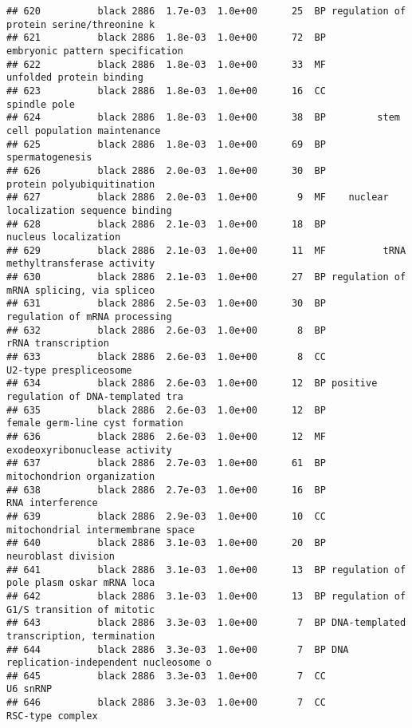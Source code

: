 \documentclass[]{article}
\begin{document}
\begin{verbatim}
## 620          black 2886  1.7e-03  1.0e+00      25  BP regulation of protein serine/threonine k
## 621          black 2886  1.8e-03  1.0e+00      72  BP          embryonic pattern specification
## 622          black 2886  1.8e-03  1.0e+00      33  MF                 unfolded protein binding
## 623          black 2886  1.8e-03  1.0e+00      16  CC                             spindle pole
## 624          black 2886  1.8e-03  1.0e+00      38  BP         stem cell population maintenance
## 625          black 2886  1.8e-03  1.0e+00      69  BP                          spermatogenesis
## 626          black 2886  2.0e-03  1.0e+00      30  BP               protein polyubiquitination
## 627          black 2886  2.0e-03  1.0e+00       9  MF    nuclear localization sequence binding
## 628          black 2886  2.1e-03  1.0e+00      18  BP                     nucleus localization
## 629          black 2886  2.1e-03  1.0e+00      11  MF          tRNA methyltransferase activity
## 630          black 2886  2.1e-03  1.0e+00      27  BP regulation of mRNA splicing, via spliceo
## 631          black 2886  2.5e-03  1.0e+00      30  BP            regulation of mRNA processing
## 632          black 2886  2.6e-03  1.0e+00       8  BP                       rRNA transcription
## 633          black 2886  2.6e-03  1.0e+00       8  CC                   U2-type prespliceosome
## 634          black 2886  2.6e-03  1.0e+00      12  BP positive regulation of DNA-templated tra
## 635          black 2886  2.6e-03  1.0e+00      12  BP          female germ-line cyst formation
## 636          black 2886  2.6e-03  1.0e+00      12  MF            exodeoxyribonuclease activity
## 637          black 2886  2.7e-03  1.0e+00      61  BP               mitochondrion organization
## 638          black 2886  2.7e-03  1.0e+00      16  BP                         RNA interference
## 639          black 2886  2.9e-03  1.0e+00      10  CC        mitochondrial intermembrane space
## 640          black 2886  3.1e-03  1.0e+00      20  BP                      neuroblast division
## 641          black 2886  3.1e-03  1.0e+00      13  BP regulation of pole plasm oskar mRNA loca
## 642          black 2886  3.1e-03  1.0e+00      13  BP regulation of G1/S transition of mitotic
## 643          black 2886  3.3e-03  1.0e+00       7  BP DNA-templated transcription, termination
## 644          black 2886  3.3e-03  1.0e+00       7  BP DNA replication-independent nucleosome o
## 645          black 2886  3.3e-03  1.0e+00       7  CC                                 U6 snRNP
## 646          black 2886  3.3e-03  1.0e+00       7  CC                         RSC-type complex

\end{verbatim}
\end{document}
